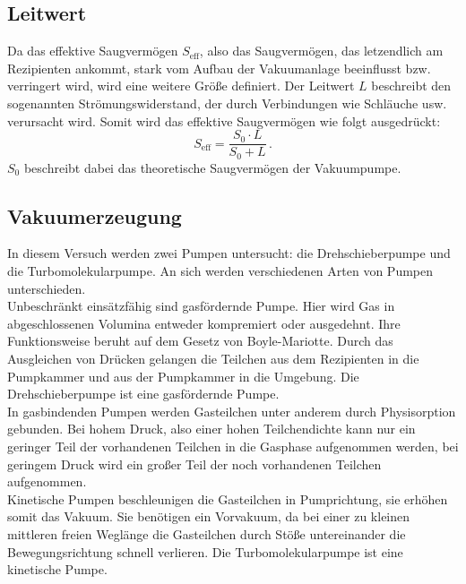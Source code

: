         \subsection{Leitwert}
        \label{subsec:leitwert}
            Da das effektive Saugvermögen $S_\text{eff}$, also das Saugvermögen, das letzendlich am Rezipienten ankommt, stark vom Aufbau der Vakuumanlage beeinflusst bzw. verringert wird, wird eine weitere Größe definiert.
            Der Leitwert $L$ beschreibt den sogenannten Strömungswiderstand, der durch Verbindungen wie Schläuche usw. verursacht wird.
            Somit wird das effektive Saugvermögen wie folgt ausgedrückt:
            \begin{equation*}
                S_\text{eff} = \frac{S_0 \cdot L}{S_0 + L} \, .
            \end{equation*}
            $S_0$ beschreibt dabei das theoretische Saugvermögen der Vakuumpumpe.


    \subsection{Vakuumerzeugung}
        In diesem Versuch werden zwei Pumpen untersucht: die Drehschieberpumpe und die Turbomolekularpumpe. An sich werden verschiedenen Arten von Pumpen unterschieden. \\
        Unbeschränkt einsätzfähig sind gasfördernde Pumpe. Hier wird Gas in abgeschlossenen Volumina entweder kompremiert oder ausgedehnt. Ihre Funktionsweise beruht auf dem Gesetz von 
        Boyle-Mariotte. Durch das Ausgleichen von Drücken gelangen die Teilchen aus dem Rezipienten in die Pumpkammer und aus der Pumpkammer in die Umgebung. Die Drehschieberpumpe ist eine 
        gasfördernde Pumpe. \\
        In gasbindenden Pumpen werden Gasteilchen unter anderem durch Physisorption gebunden. Bei hohem Druck, also einer hohen Teilchendichte kann nur ein geringer Teil der vorhandenen 
        Teilchen in die Gasphase aufgenommen werden, bei geringem Druck wird ein großer Teil der noch vorhandenen Teilchen aufgenommen. \\
        Kinetische Pumpen beschleunigen die Gasteilchen in Pumprichtung, sie erhöhen somit das Vakuum. 
        Sie benötigen ein Vorvakuum, da bei einer zu kleinen mittleren freien Weglänge die Gasteilchen durch Stöße untereinander die Bewegungsrichtung schnell verlieren. 
        Die Turbomolekularpumpe ist eine kinetische Pumpe.


